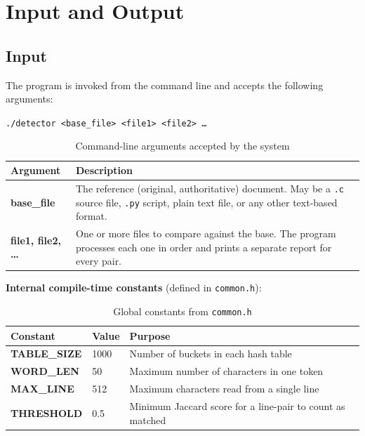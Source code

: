 \documentclass[12pt,a4paper]{article}
\begin{document}
\newpage


\section{Input and Output}

\subsection{Input}

The program is invoked from the command line and accepts the following arguments:

\begin{center}
  \texttt{./detector \textless base\_file\textgreater\
          \textless file1\textgreater\ \textless file2\textgreater\ \ldots}
\end{center}

\begin{table}[H]
\centering
\renewcommand{\arraystretch}{1.5}
\begin{tabularx}{0.94\textwidth}{>{\bfseries\ttfamily}l X}
\toprule
Argument & Description \\
\midrule
base\_file        & The reference (original, authoritative) document.
                    May be a \texttt{.c} source file, \texttt{.py} script,
                    plain text file, or any other text-based format. \\
file1, file2, \ldots & One or more files to compare against the base.
                        The program processes each one in order and prints
                        a separate report for every pair. \\
\bottomrule
\end{tabularx}
\caption{Command-line arguments accepted by the system}
\end{table}

\smallskip
\textbf{Internal compile-time constants} (defined in \texttt{common.h}):

\begin{table}[H]
\centering
\renewcommand{\arraystretch}{1.4}
\begin{tabularx}{0.94\textwidth}{>{\ttfamily\bfseries}l l X}
\toprule
Constant     & Value & Purpose \\
\midrule
TABLE\_SIZE   & 1000  & Number of buckets in each hash table \\
WORD\_LEN    & 50    & Maximum number of characters in one token \\
MAX\_LINE    & 512   & Maximum characters read from a single line \\
THRESHOLD   & 0.5   & Minimum Jaccard score for a line-pair to count as matched \\
\bottomrule
\end{tabularx}
\caption{Global constants from \texttt{common.h}}
\end{table}
\end{document}
